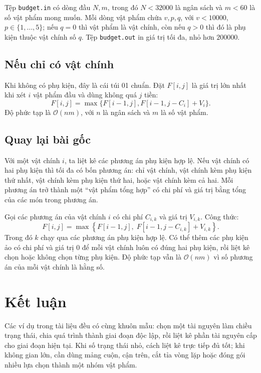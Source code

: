\documentclass[11pt]{article}
\newcommand{\Oh}{\mathcal{O}}
\begin{document}
Tệp \texttt{budget.in} có dòng đầu \(N,m\), trong đó \(N<32000\) là ngân sách
và \(m<60\) là số vật phẩm mong muốn. Mỗi dòng vật phẩm chứa \(v,p,q\), với
\(v<10000\), \(p\in\{1,\ldots,5\}\); nếu \(q=0\) thì vật phẩm là vật chính,
còn nếu \(q>0\) thì đó là phụ kiện thuộc vật chính số \(q\). Tệp
\texttt{budget.out} in giá trị tối đa, nhỏ hơn \(200000\).

\subsection{Nếu chỉ có vật chính}

Khi không có phụ kiện, đây là cái túi 01 chuẩn. Đặt \(F[i,j]\) là giá trị lớn
nhất khi xét \(i\) vật phẩm đầu và dùng không quá \(j\) tiền:
\[
  F[i,j]=\max\{F[i-1,j],F[i-1,j-C_i]+V_i\}.
\]
Độ phức tạp là \(\Oh(nm)\), với \(n\) là ngân sách và \(m\) là số vật phẩm.

\subsection{Quay lại bài gốc}

Với một vật chính \(i\), ta liệt kê các phương án phụ kiện hợp lệ. Nếu vật
chính có hai phụ kiện thì tối đa có bốn phương án: chỉ vật chính, vật chính
kèm phụ kiện thứ nhất, vật chính kèm phụ kiện thứ hai, hoặc vật chính kèm cả
hai. Mỗi phương án trở thành một ``vật phẩm tổng hợp'' có chi phí và giá trị
bằng tổng của các món trong phương án.

Gọi các phương án của vật chính \(i\) có chi phí \(C_{i,k}\) và giá trị
\(V_{i,k}\). Công thức:
\[
  F[i,j]=
  \max\left\{
    F[i-1,j],\;
    F[i-1,j-C_{i,k}]+V_{i,k}
  \right\}.
\]
Trong đó \(k\) chạy qua các phương án phụ kiện hợp lệ. Có thể thêm các phụ
kiện ảo có chi phí và giá trị \(0\) để mỗi vật chính luôn có đúng hai phụ
kiện, rồi liệt kê chọn hoặc không chọn từng phụ kiện. Độ phức tạp vẫn là
\(\Oh(nm)\) vì số phương án của mỗi vật chính là hằng số.

\enlargethispage{2\baselineskip}
\section*{Kết luận}

Các ví dụ trong tài liệu đều có cùng khuôn mẫu: chọn một tài nguyên làm chiều
trạng thái, chia quá trình thành giai đoạn độc lập, rồi liệt kê phần tài
nguyên cấp cho giai đoạn hiện tại. Khi số trạng thái nhỏ, cách liệt kê trực
tiếp đủ tốt; khi không gian lớn, cần dùng mảng cuộn, cận trên, cắt tỉa vòng
lặp hoặc đóng gói nhiều lựa chọn thành một nhóm vật phẩm.
\end{document}
